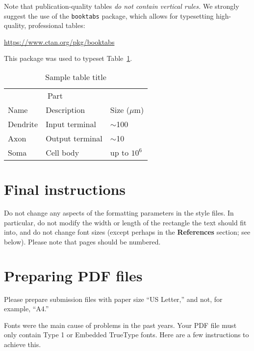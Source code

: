 \documentclass{article}
\begin{document}
Note that publication-quality tables \emph{do not contain vertical
  rules.} We strongly suggest the use of the \verb+booktabs+ package,
which allows for typesetting high-quality, professional tables:
\begin{center}
  \url{https://www.ctan.org/pkg/booktabs}
\end{center}
This package was used to typeset Table~\ref{sample-table}.

\begin{table}[t]
  \caption{Sample table title}
  \label{sample-table}
  \centering
  \begin{tabular}{lll}
    \toprule
    \multicolumn{2}{c}{Part}                   \\
    \cmidrule{1-2}
    Name     & Description     & Size ($\mu$m) \\
    \midrule
    Dendrite & Input terminal  & $\sim$100     \\
    Axon     & Output terminal & $\sim$10      \\
    Soma     & Cell body       & up to $10^6$  \\
    \bottomrule
  \end{tabular}
\end{table}

\section{Final instructions}

Do not change any aspects of the formatting parameters in the style
files.  In particular, do not modify the width or length of the
rectangle the text should fit into, and do not change font sizes
(except perhaps in the \textbf{References} section; see below). Please
note that pages should be numbered.

\section{Preparing PDF files}

Please prepare submission files with paper size ``US Letter,'' and
not, for example, ``A4.''

Fonts were the main cause of problems in the past years. Your PDF file
must only contain Type 1 or Embedded TrueType fonts. Here are a few
instructions to achieve this.
\end{document}

